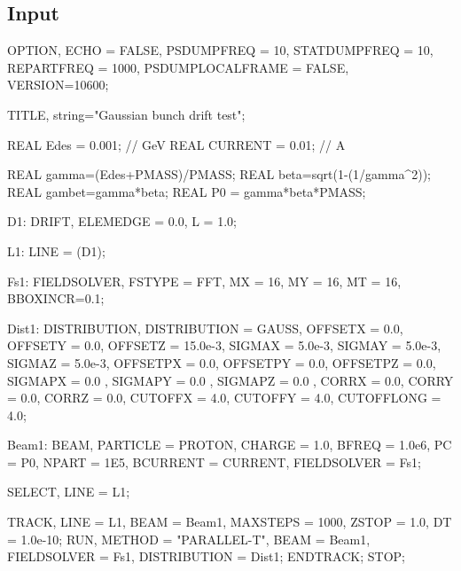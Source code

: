 \subsection{\opal Input}
\begin{longexample}
OPTION, ECHO = FALSE, PSDUMPFREQ = 10,
STATDUMPFREQ = 10, REPARTFREQ = 1000,
PSDUMPLOCALFRAME = FALSE, VERSION=10600;

TITLE, string="Gaussian bunch drift test";

REAL Edes    = 0.001;        // GeV
REAL CURRENT = 0.01;  // A

REAL gamma=(Edes+PMASS)/PMASS;
REAL beta=sqrt(1-(1/gamma^2));
REAL gambet=gamma*beta;
REAL P0 = gamma*beta*PMASS;

D1: DRIFT, ELEMEDGE = 0.0, L = 1.0;

L1: LINE = (D1);

Fs1: FIELDSOLVER, FSTYPE = FFT, MX = 16, MY = 16, MT = 16, BBOXINCR=0.1;

Dist1: DISTRIBUTION, DISTRIBUTION = GAUSS,
       OFFSETX = 0.0, OFFSETY = 0.0, OFFSETZ = 15.0e-3,
       SIGMAX = 5.0e-3, SIGMAY = 5.0e-3, SIGMAZ = 5.0e-3,
       OFFSETPX = 0.0, OFFSETPY = 0.0, OFFSETPZ = 0.0,
       SIGMAPX = 0.0 , SIGMAPY = 0.0 , SIGMAPZ = 0.0 ,
       CORRX = 0.0, CORRY = 0.0, CORRZ = 0.0,
       CUTOFFX = 4.0, CUTOFFY = 4.0, CUTOFFLONG = 4.0;

Beam1: BEAM, PARTICLE = PROTON, CHARGE = 1.0, BFREQ = 1.0e6, PC = P0,
               NPART = 1E5, BCURRENT = CURRENT, FIELDSOLVER = Fs1;

SELECT, LINE = L1;

TRACK, LINE = L1, BEAM = Beam1, MAXSTEPS = 1000, ZSTOP = 1.0, DT = 1.0e-10;
 RUN, METHOD = "PARALLEL-T", BEAM = Beam1, FIELDSOLVER = Fs1, DISTRIBUTION = Dist1;
ENDTRACK;
STOP;
\end{longexample}


